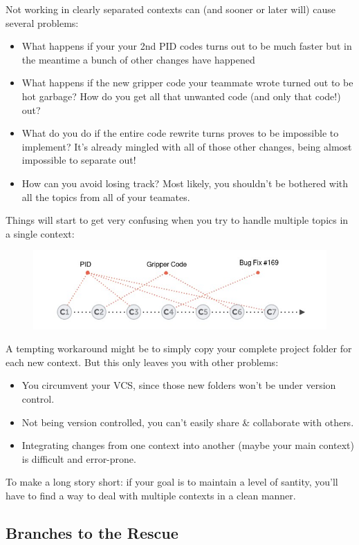 \documentclass{article}
\begin{document}
Not working in clearly separated contexts can (and sooner or later will) cause several problems:
\begin{itemize}
    \item What happens if your your 2nd PID codes turns out to be much faster but in the meantime a bunch of other changes have happened
    \item What happens if the new gripper code your teammate wrote turned out to be hot garbage? How do you get all that unwanted code (and only that code!) out?
    \item What do you do if the entire code rewrite turns proves to be impossible to implement? It's already mingled with all of those other changes, being almost impossible to separate out!
    \item How can you avoid losing track? Most likely, you shouldn't be bothered with all the topics from all of your teamates.
\end{itemize}
Things will start to get very confusing when you try to handle multiple topics in a single context:
\begin{figure}[h]
    \centering
    \includegraphics[width=4.5in]{images/one-context.jpg}
\end{figure}

A tempting workaround might be to simply copy your complete project folder for each new context. But this only leaves you with other problems:
\begin{itemize}
    \item You circumvent your VCS, since those new folders won't be under version control.
    \item Not being version controlled, you can't easily share \& collaborate with others.
    \item Integrating changes from one context into another (maybe your main context) is difficult and error-prone.
\end{itemize}

To make a long story short: if your goal is to maintain a level of santity, you'll have to find a way to deal with multiple contexts in a clean manner.

\subsection{Branches to the Rescue}
\end{document}
